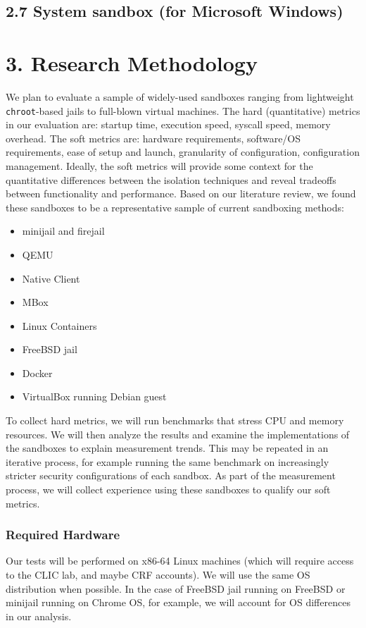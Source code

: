 \documentclass{proc}
\begin{document}
\subsection*{2.7 System sandbox (for Microsoft Windows)}

\section*{3. Research Methodology}
We plan to evaluate a sample of widely-used sandboxes ranging from lightweight \texttt{chroot}-based jails to full-blown virtual machines. The hard (quantitative) metrics in our evaluation are: startup time, execution speed, syscall speed, memory overhead. The soft metrics are: hardware requirements, software/OS requirements, ease of setup and launch, granularity of configuration, configuration management. Ideally, the soft metrics will provide some context for the quantitative differences between the isolation techniques and reveal tradeoffs between functionality and performance.
Based on our literature review, we found these sandboxes to be a representative sample of current sandboxing methods:\vspace{0.5em}
{\small
\begin{itemize}
\item minijail and firejail
\item QEMU
\item Native Client
\item MBox
\item Linux Containers
\item FreeBSD jail
\item Docker
\item VirtualBox running Debian guest
\end{itemize}
}
To collect hard metrics, we will run benchmarks that stress CPU and memory resources. We will then analyze the results and examine the implementations of the sandboxes to explain measurement trends. This may be repeated in an iterative process, for example running the same benchmark on increasingly stricter security configurations of each sandbox. As part of the measurement process, we will collect experience using these sandboxes to qualify our soft metrics.
\subsubsection*{Required Hardware}
Our tests will be performed on x86-64 Linux machines (which will require access to the CLIC lab, and maybe CRF accounts). We will use the same OS distribution when possible. In the case of FreeBSD jail running on FreeBSD or minijail running on Chrome OS, for example, we will account for OS differences in our analysis.
\end{document}
